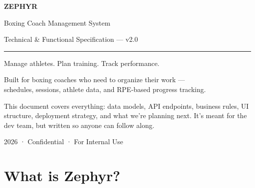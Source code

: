 \documentclass[11pt,a4paper]{article}
\begin{document}
\thispagestyle{empty}

\vspace*{3cm}

\begin{center}
{\Huge\bfseries ZEPHYR}

\vspace{0.4cm}
{\Large\color{DarkGray}Boxing Coach Management System}

\vspace{0.3cm}
{\normalsize\color{MidGray}Technical \& Functional Specification — v2.0}

\vspace{3cm}

\rule{6cm}{0.5pt}

\vspace{1cm}

{\large\color{Black}Manage athletes. Plan training. Track performance.}

\vspace{0.3cm}
{\normalsize\color{MidGray}Built for boxing coaches who need to organize their work —\\
schedules, sessions, athlete data, and RPE-based progress tracking.}

\vspace{2.5cm}

\begin{minipage}{0.7\textwidth}
\small\color{MidGray}
This document covers everything: data models, API endpoints, business rules, 
UI structure, deployment strategy, and what we're planning next. 
It's meant for the dev team, but written so anyone can follow along.
\end{minipage}

\vspace{1cm}

{\small\color{MidGray}2026 · Confidential · For Internal Use}
\end{center}

\newpage

\thispagestyle{fancy}
\renewcommand{\contentsname}{\color{Black}\bfseries Contents}
\tableofcontents

\newpage

\section{What is Zephyr?}
\end{document}
